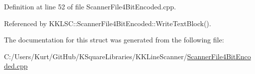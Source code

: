 Definition at line 52 of file Scanner\+File4\+Bit\+Encoded.\+cpp.



Referenced by K\+K\+L\+S\+C\+::\+Scanner\+File4\+Bit\+Encoded\+::\+Write\+Text\+Block().



The documentation for this struct was generated from the following file\+:\begin{DoxyCompactItemize}
\item 
C\+:/\+Users/\+Kurt/\+Git\+Hub/\+K\+Square\+Libraries/\+K\+K\+Line\+Scanner/\hyperlink{_scanner_file4_bit_encoded_8cpp}{Scanner\+File4\+Bit\+Encoded.\+cpp}\end{DoxyCompactItemize}
